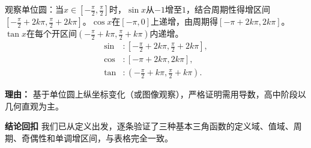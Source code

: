 \begin{proofbox}
\begin{description}[style=nextline, leftmargin=2.8em, labelsep=0.5em, itemsep=0.55em]
		\item[\textbf{步骤六（单调增区间推导）：}]
			观察单位圆：当$x\in[-\frac{\pi}{2},\frac{\pi}{2}]$时，$\sin x$从$-1$增至$1$，结合周期性得增区间$[-\frac{\pi}{2}+2k\pi,\frac{\pi}{2}+2k\pi]$。$\cos x$在$[-\pi,0]$上递增，由周期得$[-\pi+2k\pi,2k\pi]$。$\tan x$在每个开区间$(-\frac{\pi}{2}+k\pi,\frac{\pi}{2}+k\pi)$内递增。
			\[
				\begin{aligned}
					\sin &: \left[-\frac{\pi}{2}+2k\pi,\frac{\pi}{2}+2k\pi\right],\\\cos &: \left[-\pi+2k\pi,2k\pi\right],\\\tan &: \left(-\frac{\pi}{2}+k\pi,\frac{\pi}{2}+k\pi\right).
			\end{aligned}
			\]
			\par\textbf{理由：} 基于单位圆上纵坐标变化（或图像观察），严格证明需用导数，高中阶段以几何直观为主。
	\end{description}

	\medskip
	\textbf{\textcolor{CProof}{结论回扣}}
	我们已从定义出发，逐条验证了三种基本三角函数的定义域、值域、周期、奇偶性和单调增区间，与表格完全一致。
\end{proofbox}
